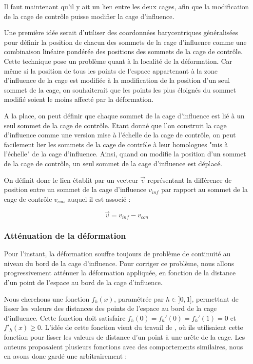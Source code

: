 Il faut maintenant qu'il y ait un lien entre les deux cages, afin que la
modification de la cage de contrôle puisse modifier la cage d'influence.

Une première idée serait d'utiliser des coordonnées barycentriques
généralisées pour définir la position de chacun des sommets de la cage
d'influence comme une combinaison linéaire pondérée des positions des sommets
de la cage de contrôle. Cette technique pose un problème quant à la localité
de la déformation. Car même si  la position de tous les points de l'espace
appartenant à la zone d'influence de la cage est modifiée à la modification de
la position d'un seul sommet de la cage, on souhaiterait que les points les
plus éloignés du sommet modifié soient le moins affecté par la déformation.

A la place, on peut définir que chaque sommet de la cage d'influence est lié à
un seul sommet de la cage de contrôle. Etant donné que l'on construit la cage
d'influence comme une version mise à l'échelle de la cage de contrôle, on peut
facilement lier les sommets de la cage de contrôle à leur homologues "mis à
l'échelle" de la cage d'influence. Ainsi, quand on modifie la position d'un
sommet de la cage de contrôle, un seul sommet de la cage d'influence est
déplacé.

On définit donc le lien établit par un vecteur $\overrightarrow{v}$
représentant la différence de position entre un sommet de la cage d'influence
$v_{inf}$ par rapport au sommet de la cage de contrôle $v_{con}$ auquel il est
associé :

\begin{displaymath}
  \overrightarrow{v} = v_{inf}-v_{con}
\end{displaymath}

\subsubsection{Atténuation de la déformation}

Pour l'instant, la déformation souffre toujours de problème de continuité au
niveau du bord de la cage d'influence. Pour corriger ce problème, nous allons
progressivement atténuer la déformation appliquée, en fonction de la distance
d'un point de l'espace au bord de la cage d'influence.

Nous cherchons une fonction $f_h(x)$, paramétrée par $h \in ]0, 1]$,
permettant de lisser les valeurs des distances des points de l'espace au bord
de la cage d'influence. Cette fonction doit satisfaire $f_h(0) = f_h'(0) =
f_h'(1) = 0$ et $f'_h(x) \geq 0$. L'idée de cette fonction vient du travail de
\cite{GPCP13}, où ils utilisaient cette fonction pour lisser les valeurs de
distance d'un point à une arête de la cage. Les auteurs proposaient plusieurs
fonctions avec des comportements similaires, nous en avons donc gardé une
arbitrairement :

